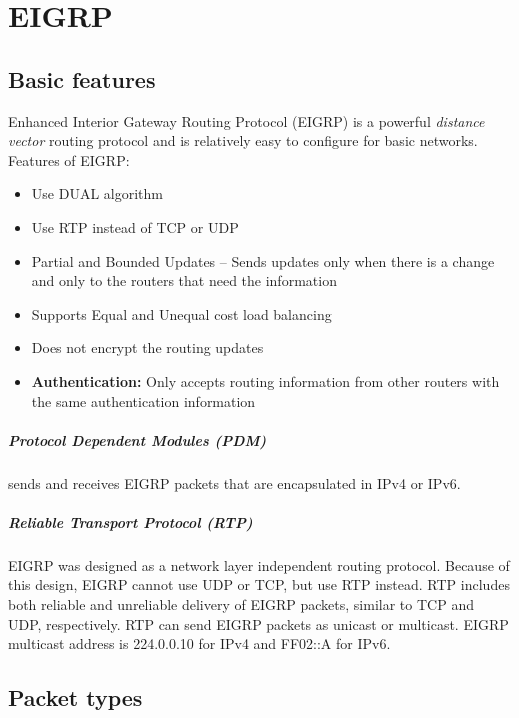 \chapter{EIGRP}

\section{Basic features}

Enhanced Interior Gateway Routing Protocol (EIGRP) is a powerful \emph{distance vector} routing protocol and is relatively easy to configure for basic networks. Features of EIGRP:

\begin{itemize}
\item Use DUAL algorithm
\item Use RTP  instead of TCP or UDP
\item Partial and Bounded Updates -- Sends updates only when there is a change and only to the routers that need the information
\item Supports Equal and Unequal cost load balancing
\item Does not encrypt the routing updates
\item \textbf{Authentication:} Only accepts routing information from other routers with the same authentication information 
\end{itemize}

\paragraph{Protocol Dependent Modules (PDM)}sends and receives EIGRP packets that are encapsulated in IPv4 or IPv6.

\paragraph{Reliable Transport Protocol (RTP)}EIGRP was designed as a network layer independent routing protocol. Because of this design, EIGRP cannot use UDP or TCP, but use RTP instead. RTP includes both reliable and unreliable delivery of EIGRP packets, similar to TCP and UDP, respectively. RTP can send EIGRP packets as unicast or multicast. EIGRP multicast address is 224.0.0.10 for IPv4 and  FF02::A for IPv6.

\section{Packet types}

